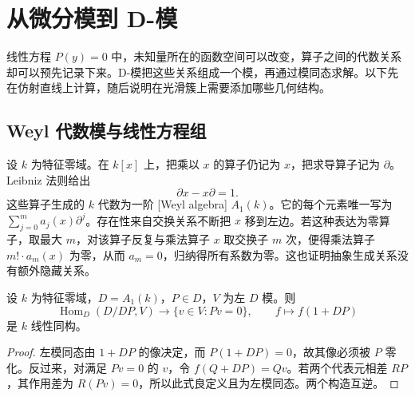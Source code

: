 %
%
\section{从微分模到 D-模}
\label{b5:sec:D01}

线性方程 \(P(y)=0\) 中，未知量所在的函数空间可以改变，算子之间的代数关系却可以预先记录下来。D-模把这些关系组成一个模，再通过模同态求解。以下先在仿射直线上计算，随后说明在光滑簇上需要添加哪些几何结构。

\subsection{Weyl 代数模与线性方程组}
\label{b5:subsec:D01:01}

设 \(k\) 为特征零域。在 \(k[x]\) 上，把乘以 \(x\) 的算子仍记为 \(x\)，把求导算子记为 \(\partial\)。Leibniz 法则给出
\[
	\partial x-x\partial=1.
\]
这些算子生成的 \(k\) 代数为一阶 [Weyl algebra] \(A_1(k)\)。它的每个元素唯一写为 \(\sum_{j=0}^m a_j(x)\partial^j\)。存在性来自交换关系不断把 \(x\) 移到左边。若这种表达为零算子，取最大 \(m\)，对该算子反复与乘法算子 \(x\) 取交换子 \(m\) 次，便得乘法算子 \(m!\cdot a_m(x)\) 为零，从而 \(a_m=0\)，归纳得所有系数为零。这也证明抽象生成关系没有额外隐藏关系。

\begin{proposition}\label{b5:prop:D-solution-module}
	设 \(k\) 为特征零域，\(D=A_1(k)\)，\(P\in D\)，\(V\) 为左 \(D\) 模。则
	\[
		\operatorname{Hom}_D(D/DP,V)\longrightarrow\{v\in V:Pv=0\}, \qquad f\longmapsto f(1+DP)
	\]
	是 \(k\) 线性同构。
\end{proposition}
\begin{proof}
	左模同态由 \(1+DP\) 的像决定，而 \(P(1+DP)=0\)，故其像必须被 \(P\) 零化。反过来，对满足 \(Pv=0\) 的 \(v\)，令 \(f(Q+DP)=Qv\)。若两个代表元相差 \(RP\)，其作用差为 \(R(Pv)=0\)，所以此式良定义且为左模同态。两个构造互逆。
\end{proof}

